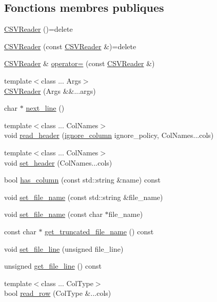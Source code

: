 \subsection*{Fonctions membres publiques}
\begin{DoxyCompactItemize}
\item 
\hyperlink{classio_1_1CSVReader_abb95a0607cd9a32231daf62f8fc841ab}{C\+S\+V\+Reader} ()=delete
\item 
\hyperlink{classio_1_1CSVReader_a0507ac5abe201969a15df76795e13c28}{C\+S\+V\+Reader} (const \hyperlink{classio_1_1CSVReader}{C\+S\+V\+Reader} \&)=delete
\item 
\hyperlink{classio_1_1CSVReader}{C\+S\+V\+Reader} \& \hyperlink{classio_1_1CSVReader_a37046e6629cf4254037c14440f14141d}{operator=} (const \hyperlink{classio_1_1CSVReader}{C\+S\+V\+Reader} \&)
\item 
{\footnotesize template$<$class ... Args$>$ }\\\hyperlink{classio_1_1CSVReader_a189debf95672e7cd7582e9f73d7203e5}{C\+S\+V\+Reader} (Args \&\&...args)
\item 
char $\ast$ \hyperlink{classio_1_1CSVReader_a9fec7797cb27f64360cc48adc5f32c72}{next\+\_\+line} ()
\item 
{\footnotesize template$<$class ... Col\+Names$>$ }\\void \hyperlink{classio_1_1CSVReader_a9fad9ae02aa243dba6bc78156c5ce7e5}{read\+\_\+header} (\hyperlink{namespaceio_a544bc96f3a6bf086cb82e599be1a8ebc}{ignore\+\_\+column} ignore\+\_\+policy, Col\+Names...\+cols)
\item 
{\footnotesize template$<$class ... Col\+Names$>$ }\\void \hyperlink{classio_1_1CSVReader_ab68eedff1bd59a49fa4ddb160dff94e0}{set\+\_\+header} (Col\+Names...\+cols)
\item 
bool \hyperlink{classio_1_1CSVReader_aaba91fff6faea12e451943e8d32a5a17}{has\+\_\+column} (const std\+::string \&name) const
\item 
void \hyperlink{classio_1_1CSVReader_a4096c1e43a4fba2b4f5ae21d047b5fbc}{set\+\_\+file\+\_\+name} (const std\+::string \&file\+\_\+name)
\item 
void \hyperlink{classio_1_1CSVReader_a5f1dc083a8fa8661f5ecdcf6aebc7b24}{set\+\_\+file\+\_\+name} (const char $\ast$file\+\_\+name)
\item 
const char $\ast$ \hyperlink{classio_1_1CSVReader_abc6321895152f5a34959b499da6512ee}{get\+\_\+truncated\+\_\+file\+\_\+name} () const
\item 
void \hyperlink{classio_1_1CSVReader_a1303bd6a2eb0d3d7c743212e52839ac4}{set\+\_\+file\+\_\+line} (unsigned file\+\_\+line)
\item 
unsigned \hyperlink{classio_1_1CSVReader_a065f805596018d1568b81152e6a22e0c}{get\+\_\+file\+\_\+line} () const
\item 
{\footnotesize template$<$class ... Col\+Type$>$ }\\bool \hyperlink{classio_1_1CSVReader_a61ecdcaa62c024bf97c4e5d133478d7e}{read\+\_\+row} (Col\+Type \&...cols)
\end{DoxyCompactItemize}


